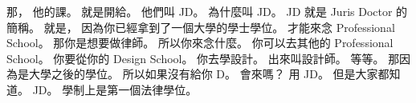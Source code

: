 \hypertarget{c01:cue:2759}{}那，
\hypertarget{c01:cue:2760}{}他的課。
\hypertarget{c01:cue:2761}{}就是開給。
\hypertarget{c01:cue:2762}{}他們叫 JD。
\hypertarget{c01:cue:2763}{}為什麼叫 JD。
\hypertarget{c01:cue:2764}{}JD 就是 Juris Doctor 的簡稱。
\hypertarget{c01:cue:2765}{}就是，
\hypertarget{c01:cue:2766}{}因為你已經拿到了一個大學的學士學位。
\hypertarget{c01:cue:2767}{}才能來念 Professional School。
\hypertarget{c01:cue:2768}{}那你是想要做律師。
\hypertarget{c01:cue:2769}{}所以你來念什麼。
\hypertarget{c01:cue:2770}{}你可以去其他的 Professional School。
\hypertarget{c01:cue:2771}{}你要從你的 Design School。
\hypertarget{c01:cue:2772}{}你去學設計。
\hypertarget{c01:cue:2773}{}出來叫設計師。
\hypertarget{c01:cue:2774}{}等等。
\hypertarget{c01:cue:2775}{}那因為是大學之後的學位。
\hypertarget{c01:cue:2776}{}所以如果沒有給你 D。
\hypertarget{c01:cue:2777}{}會來嗎？
\hypertarget{c01:cue:2778}{}用 JD。
\hypertarget{c01:cue:2779}{}但是大家都知道。
\hypertarget{c01:cue:2780}{}JD。
\hypertarget{c01:cue:2781}{}學制上是第一個法律學位。

